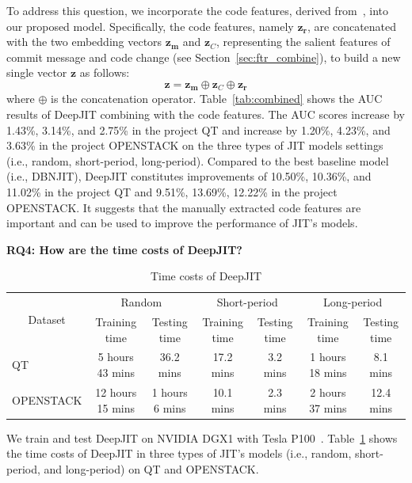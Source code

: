 To address this question, we incorporate the code features, derived from~\cite{mcintosh2018fix}, into our proposed model. Specifically, the code features, namely $\textbf{z}_\textbf{r}$, are concatenated with the two embedding vectors  $\textbf{z}_\textbf{m}$ and $\textbf{z}_C$, representing the salient features of commit message and code change (see Section~\ref{sec:ftr_combine}), to build a new single vector $\textbf{z}$ as follows:
\begin{equation}
\label{eq:combined_ftr}
\textbf{z} = \textbf{z}_\textbf{m} \oplus \textbf{z}_C \oplus \textbf{z}_\textbf{r}
\end{equation}
where $\oplus$ is the concatenation operator. Table~\ref{tab:combined} shows the AUC results of DeepJIT combining with the code features. The AUC scores increase by 1.43\%, 3.14\%, and 2.75\% in the project QT and increase by 1.20\%, 4.23\%, and 3.63\% in the project OPENSTACK on the three types of JIT models settings (i.e., random, short-period, long-period). Compared to the best baseline model (i.e., DBNJIT), DeepJIT constitutes improvements of 10.50\%, 10.36\%, and 11.02\% in the project QT and 9.51\%, 13.69\%, 12.22\% in the project OPENSTACK. It suggests that the manually extracted code features are important and can be used to improve the performance of JIT's models.

\noindent \textbf{RQ4: How are the time costs of DeepJIT?}
\begin{table}[t!]
  \centering
  \caption{Time costs of DeepJIT}
    \begin{tabular}{|l|c|c|c|c|c|c|}
    \hline
    \multicolumn{1}{|c|}{\multirow{2}[4]{*}{Dataset}} & \multicolumn{2}{c|}{Random} & \multicolumn{2}{c|}{Short-period} & \multicolumn{2}{c|}{Long-period} \\
\cline{2-7}          & Training time & Testing time & Training time & Testing time & Training time & Testing time \\
    \hline
    \hline
    QT    & 5 hours 43 mins & 36.2 mins & 17.2 mins & 3.2 mins & 1 hours 18 mins & 8.1 mins \\
    \hline
    OPENSTACK & 12 hours 15 mins & 1 hours 6 mins & 10.1 mins & 2.3 mins & 2 hours 37 mins & 12.4 mins \\
    \hline
    \end{tabular}%
  \label{tab:cost}%
\end{table}%

We train and test DeepJIT on NVIDIA DGX1 with Tesla P100~\cite{gawande2018scaling}. Table~\ref{tab:cost} shows the time costs of DeepJIT in three types of JIT's models (i.e., random, short-period, and long-period) on QT and OPENSTACK. 

